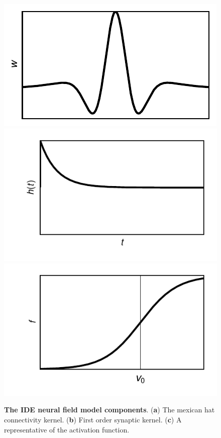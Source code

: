 \documentclass[11pt,draftcls,onecolumn,peerreview]{IEEEtran}
\begin{document}
\begin{figure}[!t]
\centering
\includegraphics[scale=.6]{./Graph/ConnectivityKernel.pdf}
\includegraphics[scale=.6]{./Graph/Synaptickernel.pdf}
\includegraphics[scale=.6]{./Graph/Sigmoid.pdf}
\caption{ {\bf The IDE neural field model components}. (\textbf{a}) The mexican hat connectivity kernel. (\textbf{b}) First order synaptic kernel. (\textbf{c}) A representative of the activation function.}
\label{fig:Modelcomponents}
\end{figure}
\end{document}
